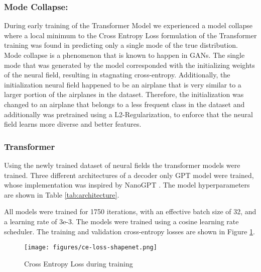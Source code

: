 \subsubsection*{Mode Collapse: }
During early training of the Transformer Model we experienced a model collapse where a local minimum to the Cross Entropy Loss formulation of the Transformer training was found in predicting only a single mode of the true distribution. Mode collapse is a phenomenon that is known to happen in GANs. The single mode that was generated by the model corresponded with the initializing weights of the neural field, resulting in stagnating cross-entropy. Additionally, the initialization neural field happened to be an airplane that is very similar to a larger portion of the airplanes in the dataset. Therefore, the initialization was changed to an airplane that belongs to a less frequent class in the dataset and additionally was pretrained using a L2-Regularization, to enforce that the neural field learns more diverse and better features.

\subsubsection*{Transformer}

Using the newly trained dataset of neural fields the transformer models were trained. Three different architectures of a decoder only GPT model were trained, whose implementation was inspired by NanoGPT \cite{Karpathy2022}. The model hyperparameters are shown in Table \ref{tab:architecture}.



All models were trained for 1750 iterations, with an effective batch size of 32, and a learning rate of 3e-3. The models were trained using a cosine learning rate scheduler. The training and validation cross-entropy losses are shown in Figure \ref{fig:loss}.


\begin{figure}[!htbp]
  \centering
  \texttt{[image: figures/ce-loss-shapenet.png]}
  \caption{Cross Entropy Loss during training}
  \label{fig:loss}
\end{figure}


